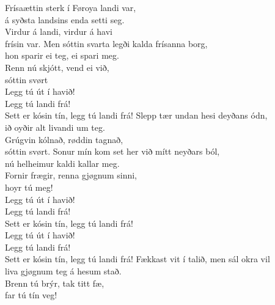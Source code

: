 Frísaættin sterk í Føroya landi var,\\
á syðsta landsins enda setti seg.\\
Virdur á landi, virdur á havi\\
frísin var.
\hops
Men sóttin svarta legði kalda frísanna borg,\\
hon sparir ei teg, ei spari meg.\\
Renn nú skjótt, vend ei við,\\
sóttin svørt
\hops
{} {}\\
 Legg tú út í havið!\\
 Legg tú landi frá!\\
 Sett er kósin tín, legg tú landi frá!
\hops
Slepp tær undan hesi deyðans ódn,\\
ið oyðir alt livandi um teg.\\
Grúgvin kólnað, røddin tagnað,\\
sóttin svørt.
\hops
Sonur mín kom set her við mítt neyðars ból,\\
nú helheimur kaldi kallar meg.\\
Fornir frægir, renna gjøgnum sinni,\\
hoyr tú meg!
\hops
{} {}\\
 Legg tú út í havið!\\
 Legg tú landi frá!\\
 Sett er kósin tín, legg tú landi frá!
\hop 
{} {}\\
 Legg tú út í havið!\\
 Legg tú landi frá!\\
 Sett er kósin tín, legg tú landi frá!
\hops
Fækkast vit í talið, men sál okra vil\\
liva gjøgnum teg á hesum stað.\\
Brenn tú brýr, tak titt fæ,\\
far tú tín veg!

\clearpage
{}

